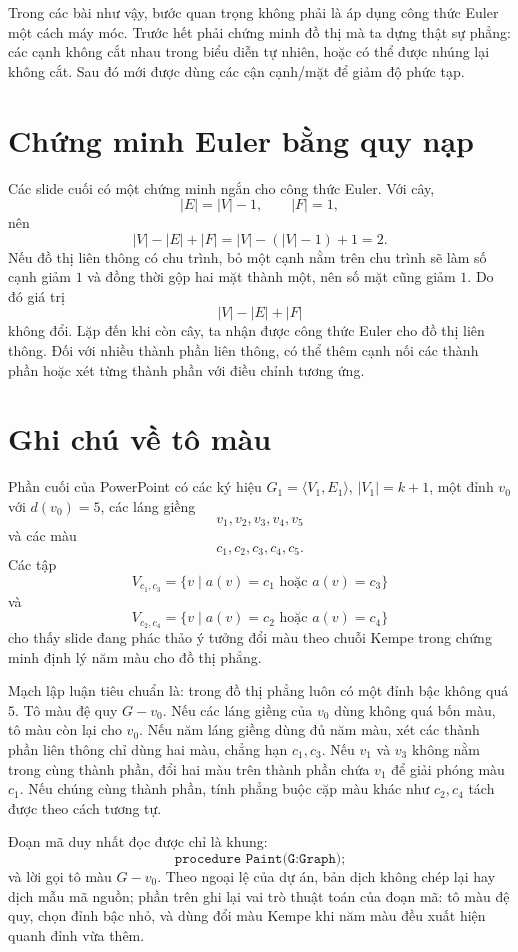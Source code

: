 \documentclass[11pt]{article}
\begin{document}
Trong các bài như vậy, bước quan trọng không phải là áp dụng công thức Euler
một cách máy móc. Trước hết phải chứng minh đồ thị mà ta dựng thật sự phẳng:
các cạnh không cắt nhau trong biểu diễn tự nhiên, hoặc có thể được nhúng lại
không cắt. Sau đó mới được dùng các cận cạnh/mặt để giảm độ phức tạp.

\section{Chứng minh Euler bằng quy nạp}

Các slide cuối có một chứng minh ngắn cho công thức Euler. Với cây,
\[
  |E|=|V|-1,\qquad |F|=1,
\]
nên
\[
  |V|-|E|+|F|=|V|-(|V|-1)+1=2.
\]
Nếu đồ thị liên thông có chu trình, bỏ một cạnh nằm trên chu trình sẽ làm số
cạnh giảm \(1\) và đồng thời gộp hai mặt thành một, nên số mặt cũng giảm
\(1\). Do đó giá trị
\[
  |V|-|E|+|F|
\]
không đổi. Lặp đến khi còn cây, ta nhận được công thức Euler cho đồ thị liên
thông. Đối với nhiều thành phần liên thông, có thể thêm cạnh nối các thành
phần hoặc xét từng thành phần với điều chỉnh tương ứng.

\section{Ghi chú về tô màu}

Phần cuối của PowerPoint có các ký hiệu \(G_1=\langle V_1,E_1\rangle\),
\(|V_1|=k+1\), một đỉnh \(v_0\) với \(d(v_0)=5\), các láng giềng
\[
  v_1,v_2,v_3,v_4,v_5
\]
và các màu
\[
  c_1,c_2,c_3,c_4,c_5.
\]
Các tập
\[
  V_{c_1,c_3}=\{v\mid a(v)=c_1\text{ hoặc }a(v)=c_3\}
\]
và
\[
  V_{c_2,c_4}=\{v\mid a(v)=c_2\text{ hoặc }a(v)=c_4\}
\]
cho thấy slide đang phác thảo ý tưởng đổi màu theo chuỗi Kempe trong chứng
minh định lý năm màu cho đồ thị phẳng.

Mạch lập luận tiêu chuẩn là: trong đồ thị phẳng luôn có một đỉnh bậc không
quá \(5\). Tô màu đệ quy \(G-v_0\). Nếu các láng giềng của \(v_0\) dùng không
quá bốn màu, tô màu còn lại cho \(v_0\). Nếu năm láng giềng dùng đủ năm màu,
xét các thành phần liên thông chỉ dùng hai màu, chẳng hạn \(c_1,c_3\). Nếu
\(v_1\) và \(v_3\) không nằm trong cùng thành phần, đổi hai màu trên thành
phần chứa \(v_1\) để giải phóng màu \(c_1\). Nếu chúng cùng thành phần, tính
phẳng buộc cặp màu khác như \(c_2,c_4\) tách được theo cách tương tự.

Đoạn mã duy nhất đọc được chỉ là khung:
\[
  \texttt{procedure Paint(G:Graph);}
\]
và lời gọi tô màu \(G-v_0\). Theo ngoại lệ của dự án, bản dịch không chép lại
hay dịch mẫu mã nguồn; phần trên ghi lại vai trò thuật toán của đoạn mã: tô
màu đệ quy, chọn đỉnh bậc nhỏ, và dùng đổi màu Kempe khi năm màu đều xuất
hiện quanh đỉnh vừa thêm.
\end{document}
